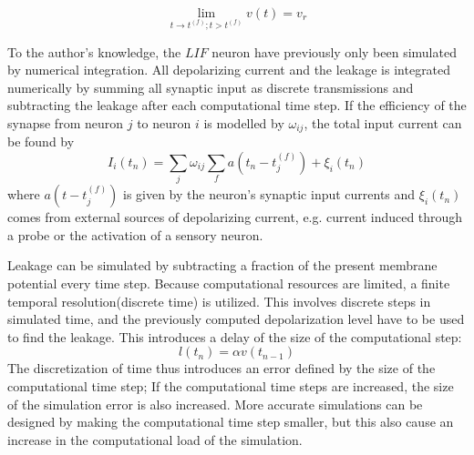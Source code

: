 \begin{equation}
	\lim\limits_{t\to t^{(f)}; t>t^{(f)}} v(t) = v_r
\end{equation}

	To the author's knowledge, the $LIF$ neuron have previously only been simulated by numerical integration.
	All depolarizing current and the leakage is integrated numerically by summing all synaptic input as discrete transmissions and subtracting the leakage after each computational time step.
	If the efficiency of the synapse from neuron $j$ to neuron $i$ is modelled by $\omega_{ij}$, the total input current can be found by 
\begin{equation}
	I_i(t_n) = \sum_j \omega_{ij} \sum_f a(t_n - t_j^{(f)}) + \xi_i(t_n)
\end{equation}
	where $a(t- t_j^{(f)})$ is given by the neuron's synaptic input currents and $\xi_i(t_n)$ comes from external sources of depolarizing current, e.g. current induced through a probe or the activation of a sensory neuron\cite{florian03}.

	Leakage can be simulated by subtracting a fraction of the present membrane potential every time step.
	Because computational resources are limited, a finite temporal resolution(discrete time) is utilized.
	This involves discrete steps in simulated time, and the previously computed depolarization level have to be used to find the leakage.
	This introduces a delay of the size of the computational step:
\begin{equation}
	l(t_n) = \alpha v(t_{n-1})
\end{equation}
	The discretization of time thus introduces an error defined by the size of the computational time step;
		If the computational time steps are increased, the size of the simulation error is also increased.
	More accurate simulations can be designed by making the computational time step smaller, but this also cause an increase in the computational load of the simulation. %
	
